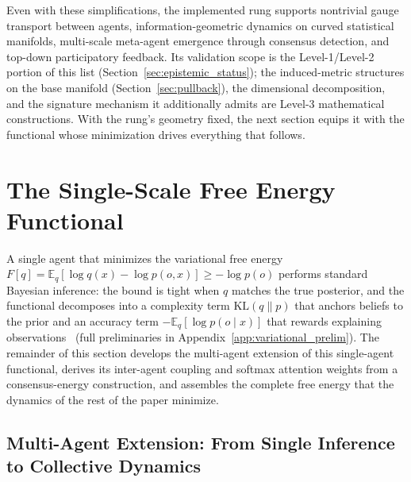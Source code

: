 \documentclass[11pt]{article}
\begin{document}
Even with these simplifications, the implemented rung supports nontrivial gauge transport between agents, information-geometric dynamics on curved statistical manifolds, multi-scale meta-agent emergence through consensus detection, and top-down participatory feedback. Its validation scope is the Level-1/Level-2 portion of this list (Section~\ref{sec:epistemic_status}); the induced-metric structures on the base manifold (Section~\ref{sec:pullback}), the dimensional decomposition, and the signature mechanism it additionally admits are Level-3 mathematical constructions. With the rung's geometry fixed, the next section equips it with the functional whose minimization drives everything that follows.

\section{The Single-Scale Free Energy Functional}\label{sec:free_energy}

A single agent that minimizes the variational free energy $F[q] = \mathbb{E}_{q}[\log q(x) - \log p(o, x)] \geq -\log p(o)$ performs standard Bayesian inference: the bound is tight when $q$ matches the true posterior, and the functional decomposes into a complexity term $\mathrm{KL}(q \| p)$ that anchors beliefs to the prior and an accuracy term $-\mathbb{E}_{q}[\log p(o \mid x)]$ that rewards explaining observations~\cite{Friston2010, parr2022active} (full preliminaries in Appendix~\ref{app:variational_prelim}). The remainder of this section develops the multi-agent extension of this single-agent functional, derives its inter-agent coupling and softmax attention weights from a consensus-energy construction, and assembles the complete free energy that the dynamics of the rest of the paper minimize.

\subsection{Multi-Agent Extension: From Single Inference to Collective Dynamics}
\end{document}
